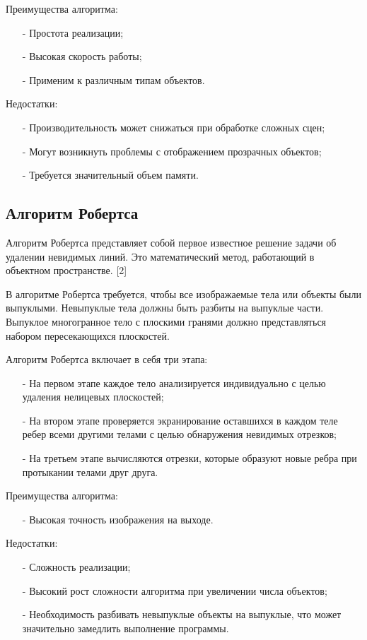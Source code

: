 Преимущества алгоритма:
\begin{itemize}[label=\arabic*)]
	\item[-] Простота реализации;
	\item[-] Высокая скорость работы;
	\item[-] Применим к различным типам объектов.
\end{itemize}

Недостатки:
\begin{itemize}[label=\arabic*)]
	\item[-] Производительность может снижаться при обработке сложных сцен;
	\item[-] Могут возникнуть проблемы с отображением прозрачных объектов;
	\item[-] Требуется значительный объем памяти.
\end{itemize}

\subsection{Алгоритм Робертса}

Алгоритм Робертса представляет собой первое известное решение задачи об удалении невидимых линий. Это математический метод, работающий в объектном пространстве. [2]

В алгоритме Робертса требуется, чтобы все изображаемые тела или объекты были выпуклыми. Невыпуклые тела должны быть разбиты на выпуклые части. Выпуклое многогранное тело с плоскими гранями должно представляться набором пересекающихся плоскостей.

Алгоритм Робертса включает в себя три этапа:
\begin{itemize}[label=\arabic*)]
	\item[-] На первом этапе каждое тело анализируется индивидуально с целью удаления нелицевых плоскостей;
	\item[-] На втором этапе проверяется экранирование оставшихся в каждом теле ребер всеми другими телами с целью обнаружения невидимых отрезков;
	\item[-] На третьем этапе вычисляются отрезки, которые образуют новые ребра при протыкании телами друг друга.
\end{itemize}

Преимущества алгоритма:
\begin{itemize}[label=\arabic*)]
	\item[-] Высокая точность изображения на выходе.
\end{itemize}
Недостатки:
\begin{itemize}[label=\arabic*)]
	\item[-] Сложность реализации;
	\item[-] Высокий рост сложности алгоритма при увеличении числа объектов;
	\item[-] Необходимость разбивать невыпуклые объекты на выпуклые, что может значительно замедлить выполнение программы.
\end{itemize}

